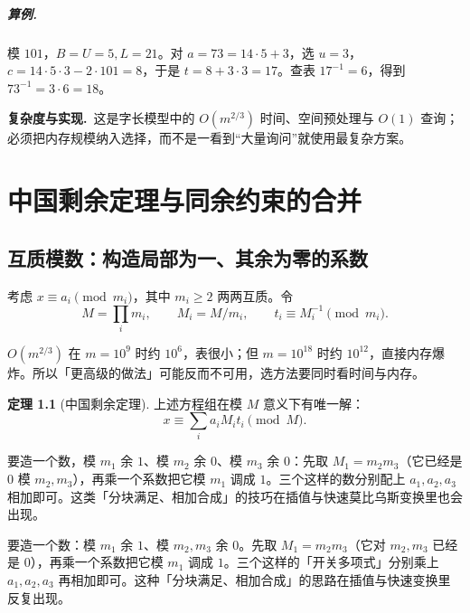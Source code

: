 \documentclass[UTF8,a4paper,11pt,oneside,openany,fontset=fandol]{ctexbook}
\theoremstyle{definition}
\newtheorem{theorem}[definition]{定理}
\newcommand{\cost}{\par\noindent\textbf{复杂度与实现.}\ }
\begin{document}
\paragraph{算例.} 模 $101$，$B=U=5,L=21$。对 $a=73=14\cdot5+3$，选 $u=3$，$c=14\cdot5\cdot3-2\cdot101=8$，于是 $t=8+3\cdot3=17$。查表 $17^{-1}=6$，得到 $73^{-1}=3\cdot6=18$。
\cost 这是字长模型中的 $O(m^{2/3})$ 时间、空间预处理与 $O(1)$ 查询；必须把内存规模纳入选择，而不是一看到“大量询问”就使用最复杂方案。



\chapter{中国剩余定理与同余约束的合并}
\section{互质模数：构造局部为一、其余为零的系数}
考虑 $x\equiv a_i\pmod{m_i}$，其中 $m_i\ge2$ 两两互质。令
\[
 M=\prod_i m_i,\qquad M_i=M/m_i,\qquad t_i\equiv M_i^{-1}\pmod{m_i}.
\]

\begin{tip}
$O(m^{2/3})$ 在 $m=10^9$ 时约 $10^6$，表很小；但 $m=10^{18}$ 时约 $10^{12}$，直接内存爆炸。所以「更高级的做法」可能反而不可用，选方法要同时看时间与内存。
\end{tip}

\begin{theorem}[中国剩余定理]
上述方程组在模 $M$ 意义下有唯一解：
\[
 x\equiv\sum_i a_iM_it_i\pmod M.
\]
\end{theorem}

\begin{tip}
要造一个数，模 $m_1$ 余 $1$、模 $m_2$ 余 $0$、模 $m_3$ 余 $0$：先取 $M_1=m_2m_3$（它已经是 $0$ 模 $m_2,m_3$），再乘一个系数把它模 $m_1$ 调成 $1$。三个这样的数分别配上 $a_1,a_2,a_3$ 相加即可。这类「分块满足、相加合成」的技巧在插值与快速莫比乌斯变换里也会出现。
\end{tip}

\begin{tip}
要造一个数：模 $m_1$ 余 $1$、模 $m_2,m_3$ 余 $0$。先取 $M_1=m_2m_3$（它对 $m_2,m_3$ 已经是 $0$），再乘一个系数把它模 $m_1$ 调成 $1$。三个这样的「开关多项式」分别乘上 $a_1,a_2,a_3$ 再相加即可。这种「分块满足、相加合成」的思路在插值与快速变换里反复出现。
\end{tip}
\end{document}
